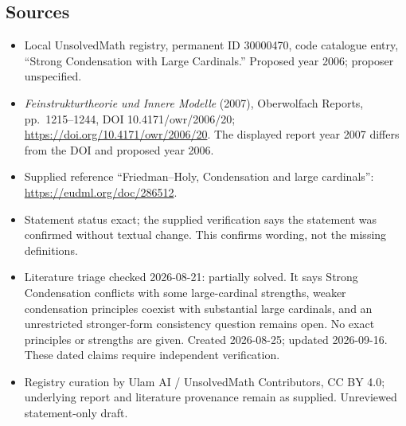 \documentclass[11pt]{article}
\begin{document}
\subsection{Sources}
\begin{itemize}
\item Local UnsolvedMath registry, permanent ID 30000470, code catalogue entry, ``Strong Condensation with Large Cardinals.'' Proposed year 2006; proposer unspecified.
\item \emph{Feinstrukturtheorie und Innere Modelle} (2007), Oberwolfach Reports, pp.\ 1215--1244, DOI 10.4171/owr/2006/20; \url{https://doi.org/10.4171/owr/2006/20}. The displayed report year 2007 differs from the DOI and proposed year 2006.
\item Supplied reference ``Friedman--Holy, Condensation and large cardinals'': \url{https://eudml.org/doc/286512}.
\item Statement status exact; the supplied verification says the statement was confirmed without textual change. This confirms wording, not the missing definitions.
\item Literature triage checked 2026-08-21: partially solved. It says Strong Condensation conflicts with some large-cardinal strengths, weaker condensation principles coexist with substantial large cardinals, and an unrestricted stronger-form consistency question remains open. No exact principles or strengths are given. Created 2026-08-25; updated 2026-09-16. These dated claims require independent verification.
\item Registry curation by Ulam AI / UnsolvedMath Contributors, CC BY 4.0; underlying report and literature provenance remain as supplied. Unreviewed statement-only draft.
\end{itemize}
\end{document}
